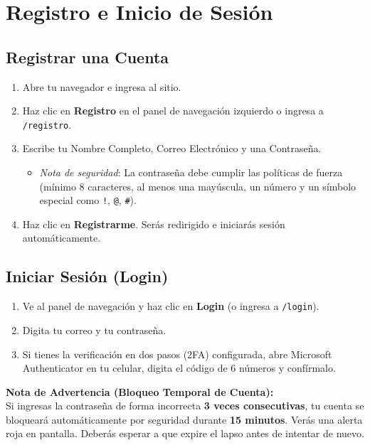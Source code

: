 \documentclass[11pt,a4paper]{article}
\begin{document}
\section{Registro e Inicio de Sesión}

\subsection{Registrar una Cuenta}
\begin{enumerate}
    \item Abre tu navegador e ingresa al sitio.
    \item Haz clic en \textbf{Registro} en el panel de navegación izquierdo o ingresa a \texttt{/registro}.
    \item Escribe tu Nombre Completo, Correo Electrónico y una Contraseña.
    \begin{itemize}
        \item \textit{Nota de seguridad}: La contraseña debe cumplir las políticas de fuerza (mínimo 8 caracteres, al menos una mayúscula, un número y un símbolo especial como \texttt{!}, \texttt{@}, \texttt{\#}).
    \end{itemize}
    \item Haz clic en \textbf{Registrarme}. Serás redirigido e iniciarás sesión automáticamente.
\end{enumerate}

\subsection{Iniciar Sesión (Login)}
\begin{enumerate}
    \item Ve al panel de navegación y haz clic en \textbf{Login} (o ingresa a \texttt{/login}).
    \item Digita tu correo y tu contraseña.
    \item Si tienes la verificación en dos pasos (2FA) configurada, abre Microsoft Authenticator en tu celular, digita el código de 6 números y confírmalo.
\end{enumerate}

\textbf{Nota de Advertencia (Bloqueo Temporal de Cuenta):}\\
Si ingresas la contraseña de forma incorrecta \textbf{3 veces consecutivas}, tu cuenta se bloqueará automáticamente por seguridad durante \textbf{15 minutos}. Verás una alerta roja en pantalla. Deberás esperar a que expire el lapso antes de intentar de nuevo.
\end{document}
